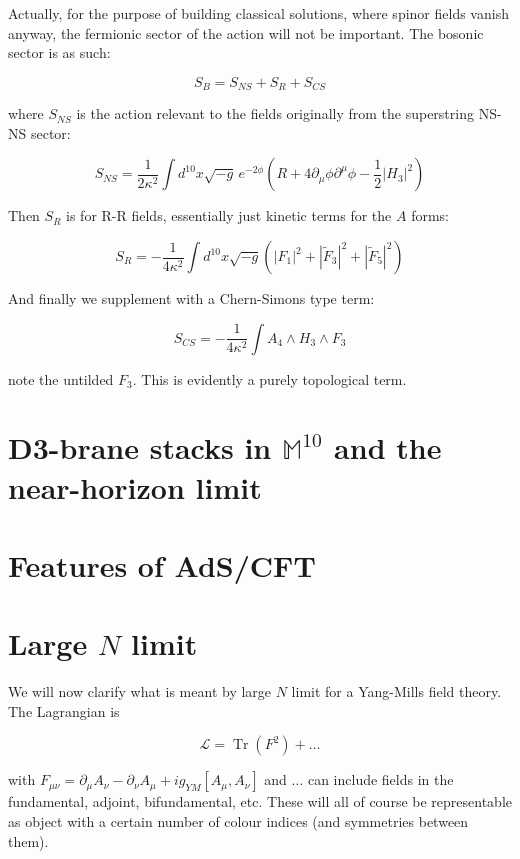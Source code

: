 \documentclass[11pt,a4paper,twoside,openright]{book}
\DeclareMathOperator{\Tr}{Tr}
\begin{document}
Actually, for the purpose of building classical solutions, where spinor fields vanish anyway, the fermionic sector of the action will not be important. The bosonic sector is as such:

\[ S_B = S_{NS} + S_R + S_{CS} \]

where $S_{NS}$ is the action relevant to the fields originally from the superstring NS-NS sector:

\[ S_{NS} = \frac{1}{2\kappa^2} \int d^{10} x \sqrt{-g} \, e^{-2\phi} \left( R + 4 \partial_\mu \phi \partial^\mu \phi - \frac{1}{2} | H_3 |^2 \right) \]

Then $S_R$ is for R-R fields, essentially just kinetic terms for the $A$ forms:

\[ S_R = -\frac{1}{4\kappa^2} \int d^{10} x \sqrt{-g} 
\left(| F_1 |^2 + | \tilde{F}_3 |^2 + | \tilde{F}_5 |^2 \right)\]

And finally we supplement with a Chern-Simons type term:

\[ S_{CS} = -\frac{1}{4\kappa^2} \int A_4 \wedge H_3 \wedge F_3 \]

note the untilded $F_3$. This is evidently a purely topological term.

\cite{kw_SB}

\section{D3-brane stacks in $\mathbb{M}^{10}$ and the near-horizon limit}

\section{Features of AdS/CFT}

\section{Large $N$ limit}

We will now clarify what is meant by large $N$ limit for a Yang-Mills field theory.\\

The Lagrangian is

\[\mathcal{L} = \Tr \left(F^2\right) + \ldots \]

with $F_{\mu\nu} = \partial_\mu A_\nu - \partial_\nu A_\mu + i g_{YM} [A_\mu,A_\nu]$ and $\ldots$ can include fields in the fundamental, adjoint, bifundamental, etc. These will all of course be representable as object with a certain number of colour indices (and symmetries between them).\\
\end{document}
